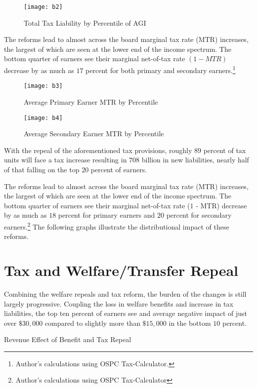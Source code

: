 \documentclass{article}
\begin{document}
\begin{figure}[H]
\centering
\caption{Total Tax Liability by Percentile of AGI}
\texttt{[image: b2]}
\end{figure}

The reforms lead to almost across the board marginal tax rate (MTR) increases, the largest of which are seen at the lower end of the income spectrum. The bottom quarter of earners see their marginal net-of-tax rate $(1 - MTR)$ decrease by as much as $17$ percent for both primary and secondary earners.\footnote{Author’s calculations using OSPC Tax-Calculator.}


\begin{figure}[H]
\centering
\caption{Average Primary Earner MTR by Percentile}
\texttt{[image: b3]}
\end{figure}

\begin{figure}[H]
\centering
\caption{Average Secondary Earner MTR by Percentile}
\texttt{[image: b4]}
\end{figure}

With the repeal of the aforementioned tax provisions, roughly $89$ percent of tax units will face a tax increase resulting in $708$ billion in new liabilities, nearly half of that falling on the top $20$ percent of earners.

The reforms lead to almost across the board marginal tax rate (MTR) increases, the largest of which are seen at the lower end of the income spectrum. The bottom quarter of earners see their marginal net-of-tax rate ($1$ - MTR) decrease by as much as $18$ percent for primary earners and $20$ percent for secondary earners.\footnote{Author's calculations using OSPC Tax-Calculator} The following graphs illustrate the distributional impact of these reforms.

\section{Tax and Welfare/Transfer Repeal}
Combining the welfare repeals and tax reform, the burden of the changes is still largely progressive. Coupling the loss in welfare benefits and increase in tax liabilities, the top ten percent of earners see and average negative impact of just over $\$30,000$ compared to slightly more than $\$15,000$ in the bottom $10$ percent.

\begin{table}[H]
\caption{Revenue Effect of Benefit and Tax Repeal}
\begin{center}
\begin{adjustbox}{max width=\textwidth}

\end{adjustbox}
\end{center}
\end{table}
\end{document}
